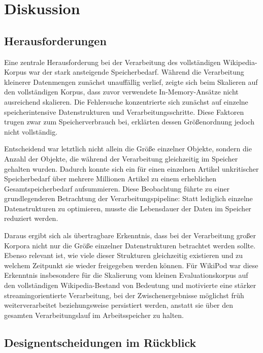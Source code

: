 \chapter{Diskussion}
\label{ch:diskussion}

\section{Herausforderungen}
Eine zentrale Herausforderung bei der Verarbeitung des vollständigen
Wikipedia-Korpus war der stark ansteigende Speicherbedarf. Während die
Verarbeitung kleinerer Datenmengen zunächst unauffällig verlief, zeigte sich
beim Skalieren auf den vollständigen Korpus, dass zuvor verwendete
In-Memory-Ansätze nicht ausreichend skalieren. Die Fehlersuche konzentrierte
sich zunächst auf einzelne speicherintensive Datenstrukturen und
Verarbeitungsschritte. Diese Faktoren trugen zwar zum Speicherverbrauch bei,
erklärten dessen Größenordnung jedoch nicht vollständig.

Entscheidend war letztlich nicht allein die Größe einzelner Objekte, sondern
die Anzahl der Objekte, die während der Verarbeitung gleichzeitig im Speicher
gehalten wurden. Dadurch konnte sich ein für einen einzelnen Artikel
unkritischer Speicherbedarf über mehrere Millionen Artikel zu einem erheblichen
Gesamtspeicherbedarf aufsummieren. Diese Beobachtung führte zu einer
grundlegenderen Betrachtung der Verarbeitungspipeline: Statt lediglich einzelne
Datenstrukturen zu optimieren, musste die Lebensdauer der Daten im Speicher
reduziert werden.

Daraus ergibt sich als übertragbare Erkenntnis, dass bei der Verarbeitung
großer Korpora nicht nur die Größe einzelner Datenstrukturen betrachtet werden
sollte. Ebenso relevant ist, wie viele dieser Strukturen gleichzeitig
existieren und zu welchem Zeitpunkt sie wieder freigegeben werden können. Für
WikiPod war diese Erkenntnis insbesondere für die Skalierung vom kleinen
Evaluationskorpus auf den vollständigen Wikipedia-Bestand von Bedeutung und
motivierte eine stärker streamingorientierte Verarbeitung, bei der
Zwischenergebnisse möglichst früh weiterverarbeitet beziehungsweise
persistiert werden, anstatt sie über den gesamten Verarbeitungslauf im
Arbeitsspeicher zu halten.

\section{Designentscheidungen im Rückblick}

